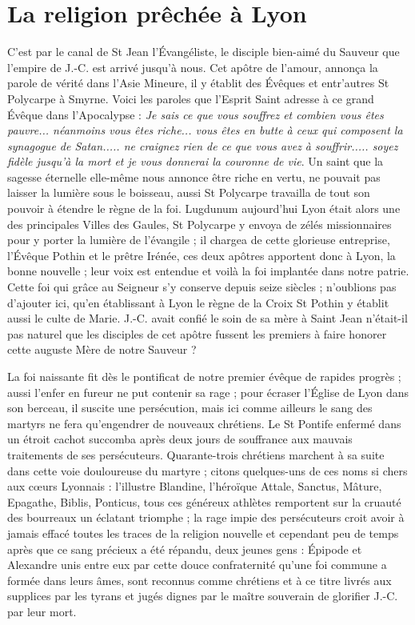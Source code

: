 \documentclass[11pt,a4paper]{report}
\begin{document}
\section*{La religion prêchée à Lyon}

C'est par le canal de St Jean l'Évangéliste, le disciple bien-aimé du Sauveur que l'empire de J.-C. est arrivé jusqu'à nous. Cet apôtre de l'amour, annonça la parole de vérité dans l'Asie Mineure, il y établit des Évêques et entr'autres St Polycarpe à Smyrne. Voici les paroles que l'Esprit Saint adresse à ce grand Évêque dans l'Apocalypse : \textit{Je sais ce que vous souffrez et combien vous êtes pauvre... néanmoins vous êtes riche... vous êtes en butte à ceux qui composent la synagogue de Satan..... ne craignez rien de ce que vous avez à souffrir..... soyez fidèle jusqu'à la mort et je vous donnerai la couronne de vie}. Un saint que la sagesse éternelle elle-même nous annonce être riche en vertu, ne pouvait pas laisser la lumière sous le boisseau, aussi St Polycarpe travailla de tout son pouvoir à étendre le règne de la foi. Lugdunum aujourd'hui Lyon était alors une des principales Villes des Gaules, St Polycarpe y envoya de zélés missionnaires pour y porter la lumière de l'évangile ; il chargea de cette glorieuse entreprise, l'Évêque Pothin et le prêtre Irénée, ces deux apôtres apportent donc à Lyon, la bonne nouvelle ; leur voix est entendue et voilà la foi implantée dans notre patrie. Cette foi qui grâce au Seigneur s'y conserve depuis seize siècles ; n'oublions pas d'ajouter ici, qu'en établissant à Lyon le règne de la Croix St Pothin y établit aussi le culte de Marie. J.-C. avait confié le soin de sa mère à Saint Jean n'était-il pas naturel que les disciples de cet apôtre fussent les premiers à faire honorer cette auguste Mère de notre Sauveur ?

La foi naissante fit dès le pontificat de notre premier évêque de rapides progrès ; aussi l'enfer en fureur ne put contenir sa rage ; pour écraser l'Église de Lyon dans son berceau, il suscite une persécution, mais ici comme ailleurs le sang des martyrs ne fera qu'engendrer de nouveaux chrétiens. Le St Pontife enfermé dans un étroit cachot succomba après deux jours de souffrance aux mauvais traitements de ses persécuteurs. Quarante-trois chrétiens marchent à sa suite dans cette voie douloureuse du martyre ; citons quelques-uns de ces noms si chers aux cœurs Lyonnais : l'illustre Blandine, l'héroïque Attale, Sanctus, Mâture, Epagathe, Biblis, Ponticus, tous ces généreux athlètes remportent sur la cruauté des bourreaux un éclatant triomphe ; la rage impie des persécuteurs croit avoir à jamais effacé toutes les traces de la religion nouvelle et cependant peu de temps après que ce sang précieux a été répandu, deux jeunes gens : Épipode et Alexandre unis entre eux par cette douce confraternité qu'une foi commune a formée dans leurs âmes, sont reconnus comme chrétiens et à ce titre livrés aux supplices par les tyrans et jugés dignes par le maître souverain de glorifier J.-C. par leur mort.
\end{document}
